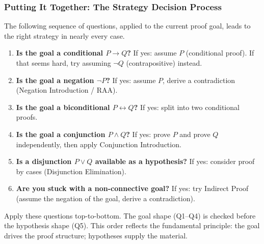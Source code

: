 
\subsubsection*{Putting It Together: The Strategy Decision Process}

The following sequence of questions, applied to the current proof goal, leads
to the right strategy in nearly every case.

\begin{tcolorbox}[colback=gray!6, colframe=gray!40, arc=2pt,
  left=6pt, right=6pt, top=4pt, bottom=4pt,
  title={\small\textbf{Strategy Selection: Questions to Ask}},
  fonttitle=\small\bfseries]
\small
\begin{enumerate}[label=\textbf{Q\arabic*.}]
\item \textbf{Is the goal a conditional $P \to Q$?}
  If yes: assume $P$ (conditional proof). If that seems hard, try assuming
  $\neg Q$ (contrapositive) instead.

\item \textbf{Is the goal a negation $\neg P$?}
  If yes: assume $P$, derive a contradiction (Negation Introduction / RAA).

\item \textbf{Is the goal a biconditional $P \leftrightarrow Q$?}
  If yes: split into two conditional proofs.

\item \textbf{Is the goal a conjunction $P \wedge Q$?}
  If yes: prove $P$ and prove $Q$ independently, then apply Conjunction Introduction.

\item \textbf{Is a disjunction $P \vee Q$ available as a hypothesis?}
  If yes: consider proof by cases (Disjunction Elimination).

\item \textbf{Are you stuck with a non-connective goal?}
  If yes: try Indirect Proof (assume the negation of the goal, derive a
  contradiction).
\end{enumerate}
\end{tcolorbox}

\begin{remark}
Apply these questions top-to-bottom. The goal shape (Q1--Q4) is checked before
the hypothesis shape (Q5). This order reflects the fundamental principle: the
goal drives the proof structure; hypotheses supply the material.
\end{remark}

